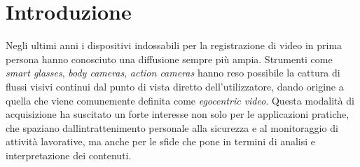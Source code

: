 \chapter{Introduzione}

Negli ultimi anni i dispositivi indossabili per la registrazione di video in prima persona hanno conosciuto una diffusione sempre più ampia. Strumenti come \emph{smart glasses}, \emph{body cameras}, \emph{action cameras} hanno reso possibile la cattura di flussi visivi continui dal punto di vista diretto dell'utilizzatore, dando origine a quella che viene comunemente definita come \emph{egocentric video}. Questa modalità di acquisizione ha suscitato un forte interesse \cite{NUNEZMARCOS2022175} non solo per le applicazioni pratiche, che spaziano dallintrattenimento personale alla sicurezza e al monitoraggio di attività lavorative, ma anche per le sfide che pone in termini di analisi e interpretazione dei contenuti.

